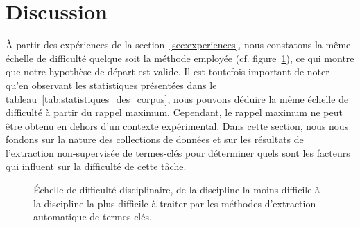 \section{Discussion}
\label{sec:discussion}
  À partir des expériences de la section~\ref{sec:experiences},
  nous constatons la même échelle de difficulté quelque soit la méthode
  employée (cf. figure~\ref{fig:echelle}), ce qui montre que notre hypothèse de
  départ est valide. Il est toutefois important de noter qu'en observant les
  statistiques présentées dans le tableau~\ref{tab:statistiques_des_corpus},
  nous pouvons déduire la même échelle de difficulté à partir du rappel maximum.
  Cependant, le rappel maximum ne peut être obtenu en dehors d'un contexte
  expérimental. Dans cette section, nous nous fondons sur la nature des
  collections de données et sur les résultats de l'extraction non-supervisée de
  termes-clés pour déterminer quels sont les facteurs qui influent sur la
  difficulté de cette tâche.
  \begin{figure}
    \centering
    \caption{Échelle de difficulté disciplinaire, de la discipline la moins
             difficile à la discipline la plus difficile à traiter par les méthodes
             d'extraction automatique de termes-clés.
             \label{fig:echelle}}
  \end{figure}

